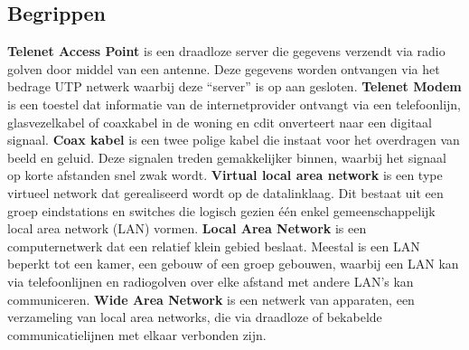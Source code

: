 \subsection{Begrippen}
\textbf{Telenet Access Point} is een draadloze server die gegevens verzendt via radio golven door middel van een antenne. Deze gegevens worden ontvangen via het bedrage UTP netwerk waarbij deze “server” is op aan gesloten.
\newline
\newline
\textbf{Telenet Modem} is een toestel dat informatie van de internetprovider ontvangt via een telefoonlijn, glasvezelkabel of coaxkabel in de woning en cdit onverteert naar een digitaal signaal.
\newline
\newline
\textbf{Coax kabel} is een twee polige kabel die instaat voor het overdragen van beeld en geluid. Deze signalen treden gemakkelijker binnen, waarbij het signaal op korte afstanden snel zwak wordt. 
\newline
\newline
\textbf{Virtual local area network} is een type virtueel network dat gerealiseerd wordt op de datalinklaag. Dit bestaat uit een groep eindstations en switches die logisch gezien één enkel gemeenschappelijk local area network (LAN) vormen.
\newline
\newline
\textbf{Local Area Network} is een computernetwerk dat een relatief klein gebied beslaat. Meestal is een LAN beperkt tot een kamer, een gebouw of een groep gebouwen, waarbij een LAN kan via telefoonlijnen en radiogolven over elke afstand met andere LAN's kan communiceren.
\newline
\newline
\textbf{Wide Area Network} is een netwerk van apparaten, een verzameling van local area networks, die via draadloze of bekabelde communicatielijnen met elkaar verbonden zijn.

